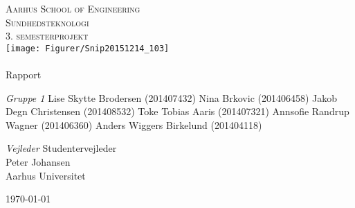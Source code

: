 \begin{titlingpage}
\begin{center}


\textsc{\LARGE Aarhus School of Engineering}\\[1cm]

\textsc{\Large Sundhedsteknologi}\\
\textsc{\Large 3. semesterprojekt}\\[1cm]

\texttt{[image: Figurer/Snip20151214\_103]}\\[1cm]

\noindent\makebox[\linewidth]{\rule{\textwidth}{0.4pt}}\\
[0.5cm]{\Huge Rapport}
\noindent\makebox[\linewidth]{\rule{\textwidth}{0.4pt}}

\end{center}

\textit{Gruppe 1} \newline
Lise Skytte Brodersen (201407432) \newline
Nina Brkovic (201406458) \newline
Jakob Degn Christensen (201408532) \newline
Toke Tobias Aaris (201407321) \newline		 
Annsofie Randrup Wagner (201406360) \newline 
Anders Wiggers Birkelund (201404118) \newline


\textit{Vejleder} \newline
Studentervejleder\\
Peter Johansen\\
Aarhus Universitet


\vfill

\begin{center}
{\large \today}
\end{center}


\end{titlingpage}